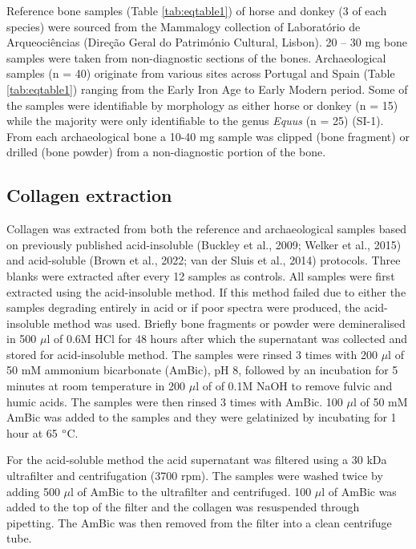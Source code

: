 \documentclass[preprint, 3p, authoryear]{elsarticle} %
\begin{document}
Reference bone samples (Table \ref{tab:eqtable1}) of horse and donkey (3 of each species) were sourced from the Mammalogy collection of Laboratório de Arqueociências (Direção Geral do Património Cultural, Lisbon). 20 -- 30 mg bone samples were taken from non-diagnostic sections of the bones. Archaeological samples (n = 40) originate from various sites across Portugal and Spain (Table \ref{tab:eqtable1}) ranging from the Early Iron Age to Early Modern period. Some of the samples were identifiable by morphology as either horse or donkey (n = 15) while the majority were only identifiable to the genus \emph{Equus} (n = 25) (SI-1). From each archaeological bone a 10-40 mg sample was clipped (bone fragment) or drilled (bone powder) from a non-diagnostic portion of the bone.

\hypertarget{collagen-extraction}{%
\subsection{Collagen extraction}\label{collagen-extraction}}

Collagen was extracted from both the reference and archaeological samples based on previously published acid-insoluble (Buckley et al., 2009; Welker et al., 2015) and acid-soluble (Brown et al., 2022; van der Sluis et al., 2014) protocols. Three blanks were extracted after every 12 samples as controls. All samples were first extracted using the acid-insoluble method. If this method failed due to either the samples degrading entirely in acid or if poor spectra were produced, the acid-insoluble method was used. Briefly bone fragments or powder were demineralised in 500 \(\mu\)l of 0.6M HCl for 48 hours after which the supernatant was collected and stored for acid-insoluble method. The samples were rinsed 3 times with 200 \(\mu\)l of 50 mM ammonium bicarbonate (AmBic), pH 8, followed by an incubation for 5 minutes at room temperature in 200 \(\mu\)l of of 0.1M NaOH to remove fulvic and humic acids. The samples were then rinsed 3 times with AmBic. 100 \(\mu\)l of 50 mM AmBic was added to the samples and they were gelatinized by incubating for 1 hour at 65 \(\text{\textdegree}\)C.

For the acid-soluble method the acid supernatant was filtered using a 30 kDa ultrafilter and centrifugation (3700 rpm). The samples were washed twice by adding 500 \(\mu\)l of AmBic to the ultrafilter and centrifuged. 100 \(\mu\)l of AmBic was added to the top of the filter and the collagen was resuspended through pipetting. The AmBic was then removed from the filter into a clean centrifuge tube.
\end{document}
